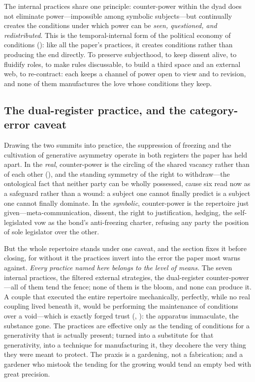\begin{claim}
The internal practices share one principle: counter-power within the dyad does not eliminate power---impossible among symbolic subjects---but continually creates the conditions under which power can be \emph{seen, questioned, and redistributed}. This is the temporal-internal form of the political economy of conditions (): like all the paper's practices, it creates conditions rather than producing the end directly. To preserve subjecthood, to keep dissent alive, to fluidify roles, to make rules discussable, to build a third space and an external web, to re-contract: each keeps a channel of power open to view and to revision, and none of them manufactures the love whose conditions they keep.
\end{claim}

\subsection{The dual-register practice, and the category-error caveat}
\label{p17:sub:praxis-dual}

Drawing the two summits into practice, the suppression of freezing and the cultivation of generative asymmetry operate in both registers the paper has held apart. In the \emph{real}, counter-power is the circling of the shared vacancy rather than of each other (), and the standing symmetry of the right to withdraw---the ontological fact that neither party can be wholly possessed, cause six read now as a safeguard rather than a wound: a subject one cannot finally predict is a subject one cannot finally dominate. In the \emph{symbolic}, counter-power is the repertoire just given---meta-communication, dissent, the right to justification, hedging, the self-legislated vow as the bond's anti-freezing charter, refusing any party the position of sole legislator over the other.

But the whole repertoire stands under one caveat, and the section fixes it before closing, for without it the practices invert into the error the paper most warns against. \emph{Every practice named here belongs to the level of means.} The seven internal practices, the filtered external strategies, the dual-register counter-power---all of them tend the fence; none of them is the bloom, and none can produce it. A couple that executed the entire repertoire mechanically, perfectly, while no real coupling lived beneath it, would be performing the maintenance of conditions over a void---which is exactly forged trust (, \cite{paperxiii}): the apparatus immaculate, the substance gone. The practices are effective only as the tending of conditions for a generativity that is actually present; turned into a substitute for that generativity, into a technique for manufacturing it, they decohere the very thing they were meant to protect. The praxis is a gardening, not a fabrication; and a gardener who mistook the tending for the growing would tend an empty bed with great precision.

